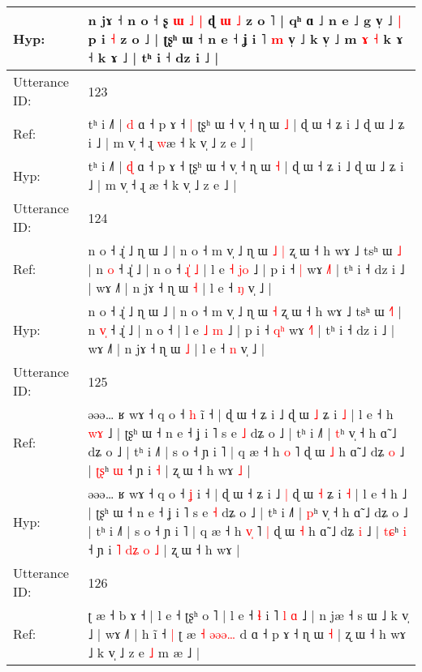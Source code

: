\documentclass[10pt]{article}
\DeclareRobustCommand{\hl}[1]{{\textcolor{red}{#1}}}
\begin{document}
\begin{longtable}{ll}
 \\
Hyp: & n jɤ ˧\hl{}\hl{} n o ˧ ʂ \hl{ɯ}\hl{ }\hl{˩} \hl{|} ɖ \hl{}\hl{ɯ} \hl{˩} z o ˥ | qʰ ɑ ˩ n e ˩ g v̩ ˩\hl{ }\hl{|} p i \hl{˧} z o ˩ | ʈʂʰ ɯ ˧ n e ˧ ʝ i ˥\hl{}\hl{} \hl{m} v̩ ˩ k v̩ ˩\hl{}\hl{}\hl{} m\hl{}\hl{}\hl{} \hl{ɤ} \hl{˧} k ɤ ˧ k ɤ ˩ | tʰ i ˧ dz i ˩ |
 \\
\midrule
Utterance ID: & 123 \\
Ref: & tʰ i ˩˥ | \hl{d} ɑ ˧ p ɤ ˧\hl{ }\hl{|} ʈʂʰ ɯ ˧ v̩ ˧ ɳ ɯ \hl{˩} | ɖ ɯ ˧ ʑ i ˩ ɖ ɯ ˩ ʑ i ˩ | m v̩ ˧ ɻ \hl{w}æ ˧ k v̩ ˩ z e ˩ |
 \\
Hyp: & tʰ i ˩˥ | \hl{ɖ} ɑ ˧ p ɤ ˧\hl{}\hl{} ʈʂʰ ɯ ˧ v̩ ˧ ɳ ɯ \hl{˧} | ɖ ɯ ˧ ʑ i ˩ ɖ ɯ ˩ ʑ i ˩ | m v̩ ˧ ɻ \hl{}æ ˧ k v̩ ˩ z e ˩ |
 \\
\midrule
Utterance ID: & 124 \\
Ref: & n o ˧ ɻ̍ ˩ ɳ ɯ ˩ | n o ˧ m v̩ ˩ ɳ ɯ\hl{ }\hl{˩} \hl{|} ʐ ɯ ˧ h wɤ ˩ tsʰ ɯ \hl{}\hl{˩} | n \hl{}\hl{o} ˧ ɻ̍ ˩ | n o ˧\hl{ }\hl{ɻ}\hl{̍}\hl{ }\hl{˩} | l e \hl{˧} \hl{j}\hl{o} ˩ | p i ˧ \hl{}\hl{|} wɤ \hl{˩}˥ | tʰ i ˧ dz i ˩ | wɤ ˩˥ | n jɤ ˧ ɳ ɯ \hl{˧} | l e ˧ \hl{ŋ} v̩ ˩ |
 \\
Hyp: & n o ˧ ɻ̍ ˩ ɳ ɯ ˩ | n o ˧ m v̩ ˩ ɳ ɯ\hl{}\hl{} \hl{˧} ʐ ɯ ˧ h wɤ ˩ tsʰ ɯ \hl{˧}\hl{˥} | n \hl{v}\hl{̩} ˧ ɻ̍ ˩ | n o ˧\hl{}\hl{}\hl{}\hl{}\hl{} | l e \hl{˩} \hl{}\hl{m} ˩ | p i ˧ \hl{q}\hl{ʰ} wɤ \hl{˧}˥ | tʰ i ˧ dz i ˩ | wɤ ˩˥ | n jɤ ˧ ɳ ɯ \hl{˩} | l e ˧ \hl{n} v̩ ˩ |
 \\
\midrule
Utterance ID: & 125 \\
Ref: & əəə… ʁ wɤ ˧ q o ˧ \hl{h} i\hl{̃} ˧ | ɖ ɯ ˧ ʑ i ˩\hl{}\hl{} ɖ ɯ \hl{˩} ʑ i \hl{˩} | l e ˧ h\hl{ }\hl{w}\hl{ɤ} ˩ | ʈʂʰ ɯ ˧ n e ˧ ʝ i ˥ s e \hl{˩} dʑ o ˩ | tʰ i ˩˥ | \hl{t}ʰ v̩ ˧ h ɑ̃ ˩ dʑ o ˩ | tʰ i ˩˥ | s o ˧ ɲ i ˥ | q æ ˧ h \hl{}\hl{o} ˥\hl{}\hl{} ɖ ɯ \hl{˩} h ɑ̃ ˩ dʑ \hl{o} ˩ | \hl{ʈ}\hl{ʂ}ʰ \hl{ɯ} ˧ ɲ i\hl{}\hl{}\hl{}\hl{}\hl{}\hl{}\hl{} \hl{˧} | ʐ ɯ ˧ h wɤ\hl{ }\hl{˩} |
 \\
Hyp: & əəə… ʁ wɤ ˧ q o ˧ \hl{ʝ} i\hl{} ˧ | ɖ ɯ ˧ ʑ i ˩\hl{ }\hl{|} ɖ ɯ \hl{˧} ʑ i \hl{˧} | l e ˧ h\hl{}\hl{}\hl{} ˩ | ʈʂʰ ɯ ˧ n e ˧ ʝ i ˥ s e \hl{˧} dʑ o ˩ | tʰ i ˩˥ | \hl{p}ʰ v̩ ˧ h ɑ̃ ˩ dʑ o ˩ | tʰ i ˩˥ | s o ˧ ɲ i ˥ | q æ ˧ h \hl{v}\hl{̩} ˥\hl{ }\hl{|} ɖ ɯ \hl{˧} h ɑ̃ ˩ dʑ \hl{i} ˩ | \hl{t}\hl{ɕ}ʰ \hl{i} ˧ ɲ i\hl{ }\hl{˥}\hl{ }\hl{d}\hl{ʑ}\hl{ }\hl{o} \hl{˩} | ʐ ɯ ˧ h wɤ\hl{}\hl{} |
 \\
\midrule
Utterance ID: & 126 \\
Ref: & ʈ æ ˧ b ɤ ˧ | l e ˧ ʈʂʰ o ˥ | l e ˧ \hl{ɬ} i ˥ \hl{l} \hl{}\hl{ɑ} ˩ | n jæ ˧ s ɯ ˩ k v̩ ˩ | wɤ ˩\hl{˥} | h ĩ ˧\hl{ }\hl{|} ʈ æ\hl{ }\hl{˧} \hl{ə}\hl{ə}\hl{ə}\hl{…} d ɑ ˧ p ɤ ˧ ɳ ɯ \hl{˧} | ʐ ɯ ˧ h wɤ ˩ k v̩ ˩ z e\hl{ }\hl{˩} m æ ˩ |

\end{longtable}
\end{document}
